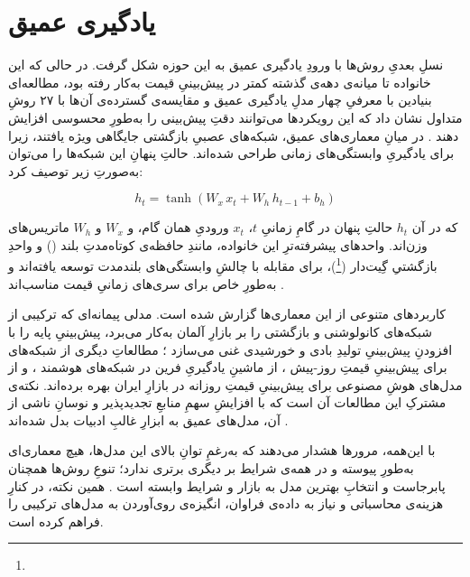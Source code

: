 \section{یادگیری عمیق}

نسلِ بعدیِ روش‌ها با ورودِ یادگیری عمیق به این حوزه شکل گرفت. در حالی که این
خانواده تا میانه‌ی دهه‌ی گذشته کمتر در پیش‌بینیِ قیمت به‌کار رفته بود، مطالعه‌ای
بنیادین با معرفیِ چهار مدلِ یادگیری عمیق و مقایسه‌ی گسترده‌ی آن‌ها با ۲۷ روشِ
متداول نشان داد که این رویکردها می‌توانند دقتِ پیش‌بینی را به‌طورِ محسوسی افزایش
دهند \cite{lago_forecasting_2018}. در میانِ معماری‌های عمیق، شبکه‌های عصبیِ
بازگشتی جایگاهی ویژه یافتند، زیرا برای یادگیریِ وابستگی‌های زمانی طراحی شده‌اند.
حالتِ پنهانِ این شبکه‌ها را می‌توان به‌صورتِ زیر توصیف کرد:

\begin{equation}
h_t = \tanh\!\left(W_x\,x_t + W_h\,h_{t-1} + b_h\right)
\end{equation}

که در آن $h_t$ حالتِ پنهان در گامِ زمانیِ $t$، $x_t$ ورودیِ همان گام، و $W_x$ و
$W_h$ ماتریس‌های وزن‌اند. واحدهای پیشرفته‌ترِ این خانواده، مانندِ حافظه‌ی
کوتاه‌مدتِ بلند () و واحدِ بازگشتیِ گِیت‌دار (\footnote{})، برای مقابله با
چالشِ وابستگی‌های بلندمدت توسعه یافته‌اند و به‌طورِ خاص برای سری‌های زمانیِ قیمت
مناسب‌اند \cite{ugurlu_electricity_2018}.

کاربردهای متنوعی از این معماری‌ها گزارش شده است. مدلی پیمانه‌ای که ترکیبی از
شبکه‌های کانولوشنی و بازگشتی را بر بازارِ آلمان به‌کار می‌برد، پیش‌بینیِ پایه را
با افزودنِ پیش‌بینیِ تولیدِ بادی و خورشیدی غنی می‌سازد \cite{zhang_forecasting_2018}؛
مطالعاتِ دیگری از شبکه‌های  برای پیش‌بینیِ قیمتِ روز-پیش
\cite{miletic_day-ahead_2022}، از ماشینِ یادگیریِ فرین در شبکه‌های هوشمند
\cite{naz_short-term_2019}، و از مدل‌های هوشِ مصنوعی برای پیش‌بینیِ قیمتِ روزانه
در بازارِ ایران \cite{heidarpanah_daily_2023} بهره برده‌اند. نکته‌ی مشترکِ این
مطالعات آن است که با افزایشِ سهمِ منابعِ تجدیدپذیر و نوسانِ ناشی از آن، مدل‌های
عمیق به ابزارِ غالبِ ادبیات بدل شده‌اند \cite{miletic_day-ahead_2022}.

با این‌همه، مرورها هشدار می‌دهند که به‌رغمِ توانِ بالای این مدل‌ها، هیچ معماری‌ای
به‌طورِ پیوسته و در همه‌ی شرایط بر دیگری برتری ندارد؛ تنوعِ روش‌ها همچنان پابرجاست
و انتخابِ بهترین مدل به بازار و شرایط وابسته است \cite{ugurlu_electricity_2018}.
همین نکته، در کنارِ هزینه‌ی محاسباتی و نیاز به داده‌ی فراوان، انگیزه‌ی روی‌آوردن
به مدل‌های ترکیبی را فراهم کرده است.
